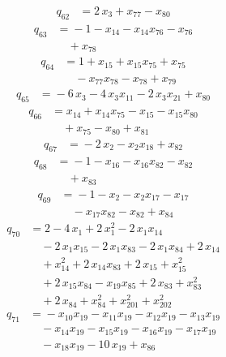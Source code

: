 \documentclass[11pt]{article}
\theoremstyle{remark}\newtheorem{remark}[theorem]{Remark}
\begin{document}
\begin{align*}
q_{62} &={}2\,x_{3} +x_{77} -x_{80}
\end{align*}
\begin{align*}
q_{63} &={}-1 -x_{14} -x_{14}x_{76} -x_{76}\\
&\quad +x_{78}
\end{align*}
\begin{align*}
q_{64} &={}1 +x_{15} +x_{15}x_{75} +x_{75}\\
&\quad -x_{77}x_{78} -x_{78} +x_{79}
\end{align*}
\begin{align*}
q_{65} &={}-6\,x_{3} -4\,x_{3}x_{11} -2\,x_{3}x_{21} +x_{80}
\end{align*}
\begin{align*}
q_{66} &={}x_{14} +x_{14}x_{75} -x_{15} -x_{15}x_{80}\\
&\quad +x_{75} -x_{80} +x_{81}
\end{align*}
\begin{align*}
q_{67} &={}-2\,x_{2} -x_{2}x_{18} +x_{82}
\end{align*}
\begin{align*}
q_{68} &={}-1 -x_{16} -x_{16}x_{82} -x_{82}\\
&\quad +x_{83}
\end{align*}
\begin{align*}
q_{69} &={}-1 -x_{2} -x_{2}x_{17} -x_{17}\\
&\quad -x_{17}x_{82} -x_{82} +x_{84}
\end{align*}
\begin{align*}
q_{70} &={}2 -4\,x_{1} +2\,x_{1}^{2} -2\,x_{1}x_{14}\\
&\quad -2\,x_{1}x_{15} -2\,x_{1}x_{83} -2\,x_{1}x_{84} +2\,x_{14}\\
&\quad +x_{14}^{2} +2\,x_{14}x_{83} +2\,x_{15} +x_{15}^{2}\\
&\quad +2\,x_{15}x_{84} -x_{19}x_{85} +2\,x_{83} +x_{83}^{2}\\
&\quad +2\,x_{84} +x_{84}^{2} +x_{201}^{2} +x_{202}^{2}
\end{align*}
\begin{align*}
q_{71} &={}-x_{10}x_{19} -x_{11}x_{19} -x_{12}x_{19} -x_{13}x_{19}\\
&\quad -x_{14}x_{19} -x_{15}x_{19} -x_{16}x_{19} -x_{17}x_{19}\\
&\quad -x_{18}x_{19} -10\,x_{19} +x_{86}
\end{align*}
\end{document}
